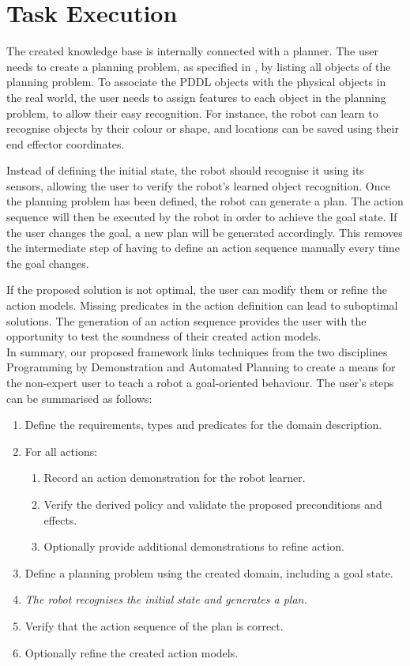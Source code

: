 \section{Task Execution}
The created knowledge base is internally connected with a planner.
 The user needs to create a planning problem, as specified in , by listing all objects of the planning problem.
 To associate the PDDL objects with the physical objects in the real world, the user needs to assign features to each object in the planning problem, to allow their easy recognition.
 For instance, the robot can learn to recognise objects by their colour or shape, and locations can be saved using their end effector coordinates.

Instead of defining the initial state, the robot should recognise it using its sensors, allowing the user to verify the robot's learned object recognition.
 Once the planning problem has been defined, the robot can generate a plan.
 The action sequence will then be executed by the robot in order to achieve the goal state.
 If the user changes the goal, a new plan will be generated accordingly.
This removes the intermediate step of having to define an action sequence manually every time the goal changes.
 
If the proposed solution is not optimal, the user can modify them or refine the action models.
 Missing predicates in the action definition can lead to suboptimal solutions.
 The generation of an action sequence provides the user with the opportunity to test the soundness of their created action models.\\

\noindent In summary, our proposed framework links techniques from the two disciplines Programming by Demonstration and Automated Planning to create a means for the non-expert user to teach a robot a goal-oriented behaviour.
 The user's steps can be summarised as follows:

\begin{enumerate}
\item Define the requirements, types and predicates for the domain description.
\item For all actions:
\begin{enumerate}
\item Record an action demonstration for the robot learner.
\item Verify the derived policy and validate the proposed preconditions and effects.
\item Optionally provide additional demonstrations to refine action.
\end{enumerate}
\item Define a planning problem using the created domain, including a goal state.
\item \textit{The robot recognises the initial state and generates a plan.}
\item Verify that the action sequence of the plan is correct.
\item Optionally refine the created action models.
\end{enumerate}